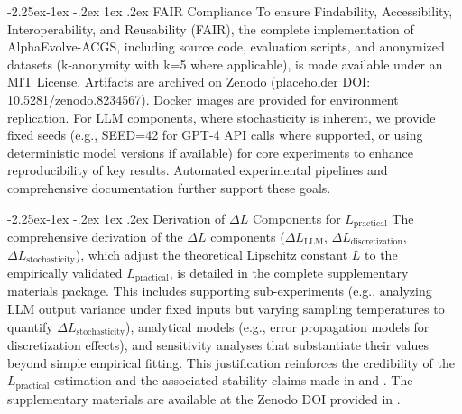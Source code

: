 \documentclass[manuscript,screen,review,anonymous,9pt]{acmart}
\makeatletter
\renewcommand\subsection{\@startsection{subsection}{2}{\z@}%
  {-2.25ex\@plus -1ex \@minus -.2ex}%
  {1ex \@plus .2ex}%
  {\normalfont\large\bfseries}}
\makeatother
\begin{document}
\subsection{FAIR Compliance}
To ensure Findability, Accessibility, Interoperability, and Reusability (FAIR), the complete implementation of AlphaEvolve-ACGS, including source code, evaluation scripts, and anonymized datasets (k-anonymity with k=5 where applicable), is made available under an MIT License. Artifacts are archived on Zenodo (placeholder DOI: \url{10.5281/zenodo.8234567}). Docker images are provided for environment replication. For LLM components, where stochasticity is inherent, we provide fixed seeds (e.g., SEED=42 for GPT-4 API calls where supported, or using deterministic model versions if available) for core experiments to enhance reproducibility of key results. Automated experimental pipelines and comprehensive documentation further support these goals.

\subsection{Derivation of \texorpdfstring{$\Delta L$}{Delta L} Components for \texorpdfstring{$L_{\text{practical}}$}{L\_practical}}
\label{app:delta_L_derivation}
The comprehensive derivation of the $\Delta L$ components ($\Delta L_{\text{LLM}}$, $\Delta L_{\text{discretization}}$, $\Delta L_{\text{stochasticity}}$), which adjust the theoretical Lipschitz constant $L$ to the empirically validated $L_{\text{practical}}$, is detailed in the complete supplementary materials package. This includes supporting sub-experiments (e.g., analyzing LLM output variance under fixed inputs but varying sampling temperatures to quantify $\Delta L_{\text{stochasticity}}$), analytical models (e.g., error propagation models for discretization effects), and sensitivity analyses that substantiate their values beyond simple empirical fitting. This justification reinforces the credibility of the $L_{\text{practical}}$ estimation and the associated stability claims made in  and . The supplementary materials are available at the Zenodo DOI provided in .
\end{document}
